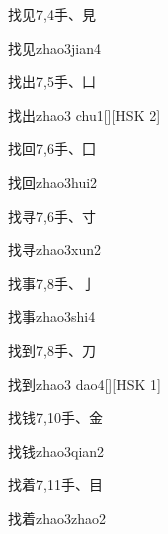 \begin{entry}{找见}{7,4}{⼿、⾒}
  \begin{phonetics}{找见}{zhao3jian4}
  \end{phonetics}
\end{entry}

\begin{entry}{找出}{7,5}{⼿、⼐}
  \begin{phonetics}{找出}{zhao3 chu1}[][HSK 2]
  \end{phonetics}
\end{entry}

\begin{entry}{找回}{7,6}{⼿、⼞}
  \begin{phonetics}{找回}{zhao3hui2}
  \end{phonetics}
\end{entry}

\begin{entry}{找寻}{7,6}{⼿、⼨}
  \begin{phonetics}{找寻}{zhao3xun2}
  \end{phonetics}
\end{entry}

\begin{entry}{找事}{7,8}{⼿、⼅}
  \begin{phonetics}{找事}{zhao3shi4}
  \end{phonetics}
\end{entry}

\begin{entry}{找到}{7,8}{⼿、⼑}
  \begin{phonetics}{找到}{zhao3 dao4}[][HSK 1]
  \end{phonetics}
\end{entry}

\begin{entry}{找钱}{7,10}{⼿、⾦}
  \begin{phonetics}{找钱}{zhao3qian2}
  \end{phonetics}
\end{entry}

\begin{entry}{找着}{7,11}{⼿、⽬}
  \begin{phonetics}{找着}{zhao3zhao2}
  \end{phonetics}
\end{entry}


